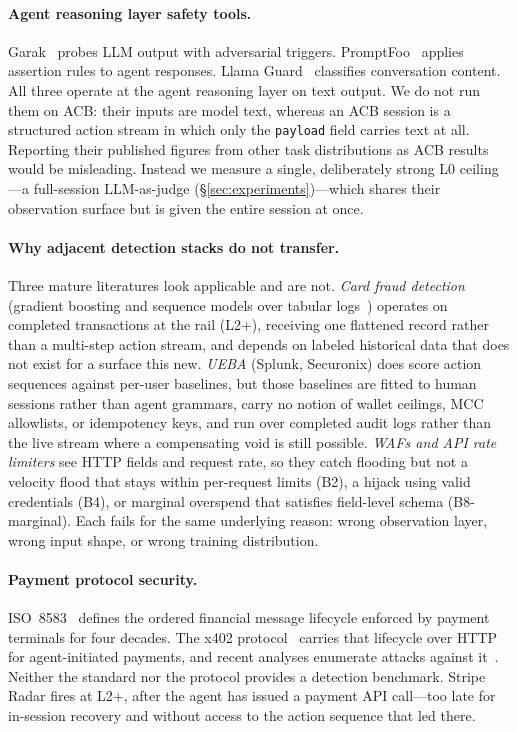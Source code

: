 \documentclass{article}
\begin{document}
\paragraph{Agent reasoning layer safety tools.}
Garak~\cite{garak} probes LLM output with adversarial triggers. PromptFoo~\cite{promptfoo}
applies assertion rules to agent responses. Llama Guard~\cite{llamaguard} classifies
conversation content. All three operate at the agent reasoning layer on text output. We do
not run them on ACB: their inputs are model text, whereas an ACB session is a structured
action stream in which only the \texttt{payload} field carries text at all. Reporting their
published figures from other task distributions as ACB results would be misleading. Instead
we measure a single, deliberately strong L0 ceiling---a full-session LLM-as-judge
(\S\ref{sec:experiments})---which shares their observation surface but is given the entire
session at once.

\paragraph{Why adjacent detection stacks do not transfer.}
Three mature literatures look applicable and are not. \emph{Card fraud detection}
(gradient boosting and sequence models over tabular logs~\cite{pozzolo2015}) operates on
completed transactions at the rail (L2+), receiving one flattened record rather than a
multi-step action stream, and depends on labeled historical data that does not exist for a
surface this new. \emph{UEBA} (Splunk, Securonix) does score action sequences against
per-user baselines, but those baselines are fitted to human sessions rather than agent
grammars, carry no notion of wallet ceilings, MCC allowlists, or idempotency keys, and run
over completed audit logs rather than the live stream where a compensating void is still
possible. \emph{WAFs and API rate limiters} see HTTP fields and request rate, so they catch
flooding but not a velocity flood that stays within per-request limits (B2), a hijack using
valid credentials (B4), or marginal overspend that satisfies field-level schema
(B8-marginal). Each fails for the same underlying reason: wrong observation layer, wrong
input shape, or wrong training distribution.

\paragraph{Payment protocol security.}
ISO~8583~\cite{iso8583} defines the ordered financial message lifecycle enforced
by payment terminals for four decades. The x402 protocol~\cite{x402} carries that
lifecycle over HTTP for agent-initiated payments, and recent analyses enumerate
attacks against it~\cite{x402attacks}. Neither the standard nor the protocol
provides a detection benchmark.
Stripe Radar fires at L2+, after the agent has issued a payment API call---too
late for in-session recovery and without access to the action sequence that led there.
\end{document}
